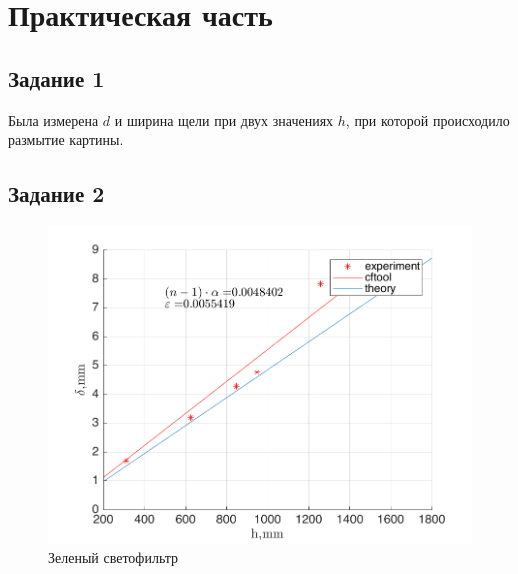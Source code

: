 \section{Практическая часть}
\subsection{Задание 1}
Была измерена $d$ и ширина щели при двух значениях $h$, при которой происходило размытие картины.  
\subsection{Задание 2}
\begin{figure}[]
	\centering
	\includegraphics[width=1\textwidth]{data/d_g.png}
	\caption{Зеленый светофильтр}
	\label{fig:d_g}
\end{figure}

